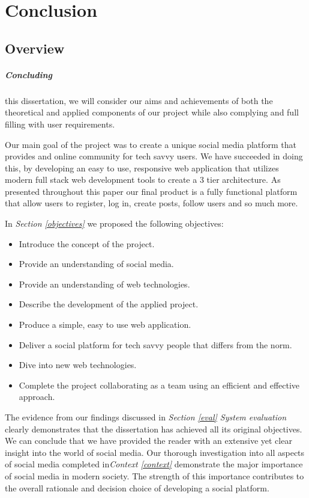 \chapter{Conclusion}
\section{Overview}
\paragraph{Concluding} this dissertation, we will consider our aims and achievements of both the theoretical and applied components of our project while also complying  and full filling with user requirements. 

Our main goal of the project was to create a unique social media platform that provides and online community for tech savvy users. We have succeeded in doing this, by developing an easy to use, responsive web application that utilizes modern full stack web development tools to create a 3 tier architecture. As presented throughout this paper our final product is a fully functional platform that allow users to register, log in, create posts, follow users and so much more.

In \textit{Section \ref{objectives}} we proposed the following objectives:
\begin{itemize}
    \item Introduce the concept of the project.
    \item Provide an understanding of social media.
    \item Provide an understanding of web technologies.
    \item Describe the development of the applied project.
    \item Produce a simple, easy to use web application.
    \item Deliver a social platform for tech savvy people that differs from the norm.
    \item Dive into new web technologies.
    \item Complete the project collaborating as a team using an efficient and effective approach.  
\end{itemize}

The evidence from our findings discussed in \textit{Section \ref{eval} System evaluation} clearly demonstrates that the dissertation has achieved all its original objectives. We can conclude that we have provided the reader with an extensive yet clear insight into the world of social media. Our thorough investigation into all aspects of social media completed in\textit{Context \ref{context}} demonstrate the major importance of social media in modern society. The strength of this importance contributes to the overall rationale and decision choice of developing a social platform. 

